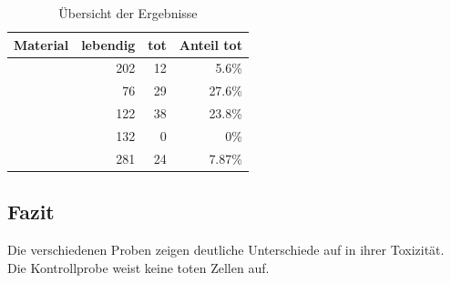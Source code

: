 \newpage
\begin{table}[h!]
	\centering
	\begin{tabular}{l r r r}
		Material & lebendig & tot & Anteil tot \\
		\hline
		\matA & 202 & 12 & 5.6\% \\
		\matB &  76 & 29 & 27.6\% \\
		\matC & 122 & 38 & 23.8\% \\
		\matD & 132 &  0 & 0\% \\
		\matE & 281 & 24 & 7.87\% \\
		\end{tabular}
	\caption{Übersicht der Ergebnisse}
\end{table}

\subsection{Fazit}
Die verschiedenen Proben zeigen deutliche Unterschiede auf in ihrer
Toxizität. Die Kontrollprobe weist keine toten Zellen auf.
